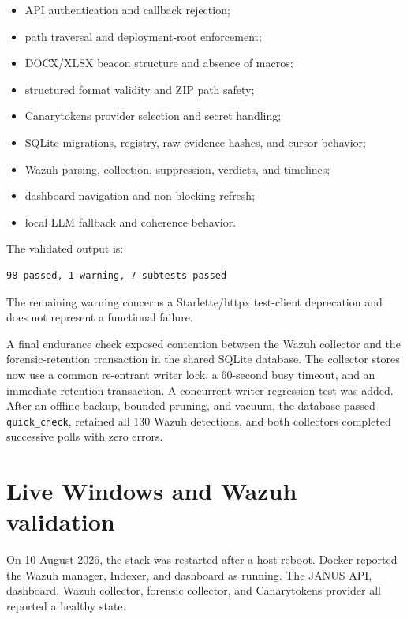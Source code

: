 \begin{itemize}
  \item API authentication and callback rejection;
  \item path traversal and deployment-root enforcement;
  \item DOCX/XLSX beacon structure and absence of macros;
  \item structured format validity and ZIP path safety;
  \item Canarytokens provider selection and secret handling;
  \item SQLite migrations, registry, raw-evidence hashes, and cursor behavior;
  \item Wazuh parsing, collection, suppression, verdicts, and timelines;
  \item dashboard navigation and non-blocking refresh;
  \item local LLM fallback and coherence behavior.
\end{itemize}

The validated output is:

\begin{lstlisting}[caption={Automated acceptance result},label={lst:pytest}]
98 passed, 1 warning, 7 subtests passed
\end{lstlisting}

The remaining warning concerns a Starlette/httpx test-client deprecation and
does not represent a functional failure.

A final endurance check exposed contention between the Wazuh collector and the
forensic-retention transaction in the shared SQLite database. The collector
stores now use a common re-entrant writer lock, a 60-second busy timeout, and an
immediate retention transaction. A concurrent-writer regression test was added.
After an offline backup, bounded pruning, and vacuum, the database passed
\texttt{quick\_check}, retained all 130 Wazuh detections, and both collectors
completed successive polls with zero errors.

\section{Live Windows and Wazuh validation}

On 10 August 2026, the stack was restarted after a host reboot. Docker reported
the Wazuh manager, Indexer, and dashboard as running. The JANUS API, dashboard,
Wazuh collector, forensic collector, and Canarytokens provider all reported a
healthy state.

